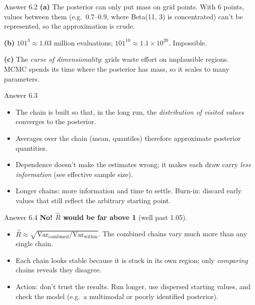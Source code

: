 \documentclass[aspectratio=43,11pt]{beamer}
\begin{document}
\begin{frame}{Answer 6.2}
  \textbf{(a)} The posterior can only put mass on grid points. With 6
  points, values between them (e.g.\ 0.7--0.9, where Beta(11, 3) is
  concentrated) can't be represented, so the approximation is crude.
  \vspace{0.4em}

  \textbf{(b)} $101^3 \approx 1.03$ million evaluations;
  $101^{10} \approx 1.1 \times 10^{20}$. Impossible.
  \vspace{0.4em}

  \textbf{(c)} The \emph{curse of dimensionality}: grids waste effort on
  implausible regions. MCMC spends its time where the posterior has mass,
  so it scales to many parameters.
\end{frame}

\begin{frame}{Answer 6.3}
  \begin{itemize}
    \item The chain is built so that, in the long run, the
      \emph{distribution of visited values} converges to the posterior.
    \item Averages over the chain (mean, quantiles) therefore approximate
      posterior quantities.
    \item Dependence doesn't make the estimates wrong; it makes each draw
      carry \emph{less information} (see effective sample size).
    \item Longer chains: more information and time to settle.
      Burn-in: discard early values that still reflect the arbitrary
      starting point.
  \end{itemize}
\end{frame}

\begin{frame}{Answer 6.4}
  \textbf{No! $\hat R$ would be far above 1} (well past 1.05).
  \begin{itemize}
    \item $\hat R \approx \sqrt{\text{Var}_{\text{combined}} /
      \text{Var}_{\text{within}}}$. The combined chains vary much more than
      any single chain.
    \item Each chain looks stable because it is stuck in its own region;
      only \emph{comparing} chains reveals they disagree.
    \item Action: don't trust the results. Run longer, use dispersed
      starting values, and check the model (e.g.\ a multimodal or poorly
      identified posterior).
  \end{itemize}
\end{frame}
\end{document}
